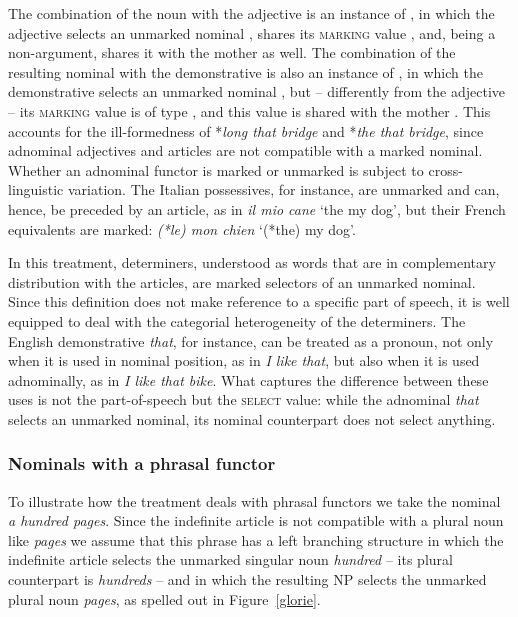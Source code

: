\documentclass[output=paper
                ,modfonts
                ,nonflat
	        ,collection
	        ,collectionchapter
	        ,collectiontoclongg
 	        ,biblatex
                ,babelshorthands
                ,newtxmath
                ,draftmode
                ,colorlinks, citecolor=brown
]{./langsci/langscibook}
\begin{document}
The combination of the noun with the adjective is an instance of , 
in which the adjective selects an unmarked nominal ,  
shares its \textsc{marking} value , and, being a non-argument, 
shares it with the mother as well. 
The combination of the resulting nominal with the demonstrative is also 
an instance of ,
in which the demonstrative selects an unmarked nominal , 
but -- differently from the adjective -- its \textsc{marking} value is of type 
, and this value is shared with the mother .    
This accounts for the ill-formedness of 
*\emph{long that bridge} and *\emph{the that bridge}, since 
adnominal adjectives and articles are not compatible with a marked nominal.  
Whether an adnominal functor is marked or unmarked is subject to cross-linguistic variation. 
The Italian possessives, for instance, are unmarked and can, hence, be preceded 
by an article, as in \emph{il mio cane} `the my dog', but   
their French equivalents are marked: \emph{(*le) mon chien} `(*the) my dog'. 

In this treatment, determiners, understood as words that are in complementary distribution with 
the articles, are marked selectors of an unmarked nominal. Since this definition does not 
make reference to a specific part of speech, it is well equipped to deal with the categorial 
heterogeneity of the determiners. The English demonstrative \emph{that}, for instance, 
can be treated as a pronoun, not only when it is used in nominal position, as in 
\emph{I like that}, but also when it is used adnominally, as in \emph{I like that bike}.   
What captures the difference between these uses is not the part-of-speech but  
the \textsc{select} value: while the adnominal \emph{that} selects an unmarked nominal, 
its nominal counterpart does not select anything.      

        
\subsubsection{Nominals with a phrasal functor} 
\label{sec-phrasal-spec}


To illustrate how the treatment deals with phrasal functors we 
take the nominal \emph{a hundred pages}. Since the indefinite article is not 
compatible with a plural noun like \emph{pages} we assume that this phrase  
has a left branching structure in which the indefinite article selects 
the unmarked singular noun \emph{hundred} -- its plural counterpart is \emph{hundreds} --  
and in which the resulting NP selects the unmarked plural noun 
\emph{pages}, as spelled out in Figure~\ref{glorie}. 
 
\end{document}
